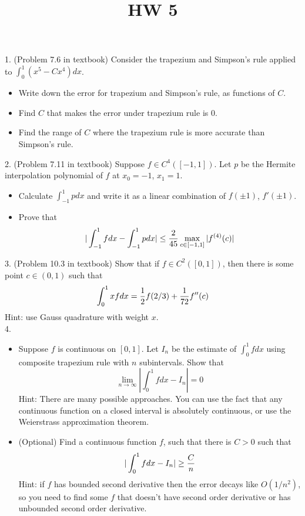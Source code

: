 \documentclass[20pt]{article} %
\title{HW 5}
\theoremstyle{break}
\begin{document}
\maketitle

1. (Problem 7.6 in textbook) Consider the trapezium and Simpson's rule applied to $\int_0^1(x^5-Cx^4)dx$.
\begin{itemize}
\item Write down the error for trapezium and Simpson's rule, as functions of $C$.
\item Find $C$ that makes the error under trapezium rule is $0$.
\item Find the range of $C$ where the trapezium rule is more accurate than Simpson's rule.
\end{itemize}

2. (Problem 7.11 in textbook) Suppose $f\in C^4([-1, 1])$. Let $p$ be the Hermite interpolation polynomial of $f$ at $x_0=-1$, $x_1=1$.
\begin{itemize}
\item Calculate $\int_{-1}^1pdx$ and write it as a linear combination of $f(\pm 1)$, $f'(\pm 1)$.
\item Prove that
  \[|\int_{-1}^1fdx-\int_{-1}^1pdx|\leq {2\over 45}\max_{c\in [-1, 1]}|f^{(4)}(c)|\]
\end{itemize}


3. (Problem 10.3 in textbook) Show that if $f\in C^2([0, 1])$, then there is some point $c\in (0, 1)$ such that
\[\int_0^1xfdx={1\over 2}f(2/3)+{1\over 72}f''(c)\]
Hint: use Gauss quadrature with weight $x$.\\

4. \begin{itemize}
\item Suppose $f$ is continuous on $[0, 1]$. Let $I_n$ be the estimate of $\int_0^1fdx$ using composite trapezium rule with $n$ subintervals. Show that
  \[\lim_{n\rightarrow\infty}|\int_0^1fdx-I_n|=0\]
 Hint: There are many possible approaches. You can use the fact that any continuous function on a closed interval is absolutely continuous, or use the Weierstrass approximation theorem.
\item (Optional) Find a continuous function $f$, such that there is $C>0$ such that 
  \[|\int_0^1fdx-I_n|\geq {C\over n}\]
  Hint: if $f$ has bounded second derivative then the error decays like $O(1/n^2)$, so you need to find some $f$ that doesn't have second order derivative or has unbounded second order derivative.
\end{itemize}
\end{document}
